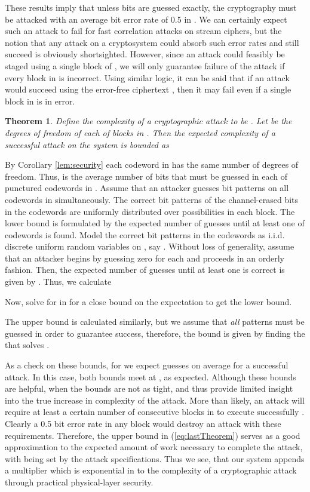 \documentclass[10pt,twocolumn,twoside]{IEEEtran} \newlength{\pic}
\newtheorem{theorem}{Theorem}
\theoremstyle{definition}
\theoremstyle{remark}
\theoremstyle{plain}
\begin{document}
These results imply that unless  bits are guessed exactly, the cryptography must be attacked with an average bit error rate of 0.5 in . We can certainly expect such an attack to fail for fast correlation attacks on stream ciphers, but the notion that any attack on a cryptosystem could absorb such error rates and still succeed is obviously shortsighted. However, since an attack could feasibly be staged using a single block of , we will only guarantee failure of the attack if every block in  is incorrect. Using similar logic, it can be said that if an attack would succeed using the error-free ciphertext , then it may fail even if a single block in  is in error.
\begin{theorem}
 Define the complexity of a cryptographic attack to be . Let  be the degrees of freedom of each of  blocks in . Then the expected complexity  of a successful attack on the system is bounded as
 
\end{theorem}
\begin{IEEEproof}
 By Corollary \ref{lem:security} each codeword in  has the same number of degrees of freedom. Thus,  is the average number of bits that must be guessed in each of  punctured codewords in . Assume that an attacker guesses bit patterns on all codewords in  simultaneously. The correct bit patterns of the channel-erased bits in the  codewords  are uniformly distributed over  possibilities in each block. The lower bound is formulated by the expected number of guesses until at least one of  codewords is found. Model the correct bit patterns in the  codewords as i.i.d. discrete uniform random variables on , say . Without loss of generality, assume that an attacker begins by guessing zero for each  and proceeds in an orderly fashion. Then, the expected number of guesses until at least one is correct is given by . Thus, we calculate 
 
 Now, solve for  in  for a close bound on the expectation to get the lower bound.

 The upper bound is calculated similarly, but we assume that \emph{all} patterns must be guessed in order to guarantee success, therefore, the bound is given by finding the  that solves .
\end{IEEEproof}
As a check on these bounds, for  we expect  guesses on average for a successful attack. In this case, both bounds meet at , as expected. Although these bounds are helpful, when  the bounds are not as tight, and thus provide limited insight into the true increase in complexity of the attack. More than likely, an attack will require at least a certain number of consecutive blocks in  to execute successfully \cite{Meier89}. Clearly a 0.5 bit error rate in any block would destroy an attack with these requirements. Therefore, the upper bound in (\ref{eq:lastTheorem}) serves as a good approximation to the expected amount of work necessary to complete the attack, with  being set by the attack specifications. Thus we see, that our system appends a multiplier which is exponential in  to the complexity of a cryptographic attack through practical physical-layer security.
\end{document}
